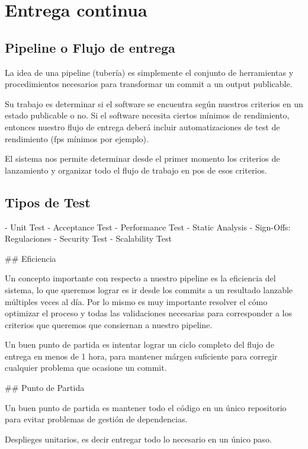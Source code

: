 
\section{Entrega continua}\label{cd:entrega-continua}

\subsection{Pipeline o Flujo de entrega}\label{cd:flujo-de-entrega}

La idea de una pipeline (tubería) es simplemente el conjunto de herramientas y
procedimientos necesarios para transformar un commit a un output publicable.

Su trabajo es determinar si el software se encuentra según nuestros criterios
en un estado publicable o no. Si el software necesita ciertos mínimos de
rendimiento, entonces nuestro flujo de entrega deberá incluir automatizaciones
de test de rendimiento (fps mínimos por ejemplo).

El sistema nos permite determinar desde el primer momento los criterios de
lanzamiento y organizar todo el flujo de trabajo en pos de esos criterios.

\subsection{Tipos de Test}

- Unit Test
- Acceptance Test
- Performance Test
- Static Analysis
- Sign-Offs: Regulaciones
- Security Test
- Scalability Test

## Eficiencia

Un concepto importante con respecto a nuestro pipeline es la eficiencia del
sistema, lo que queremos lograr es ir desde los commits a un resultado lanzable
múltiples veces al día. Por lo mismo es muy importante resolver el cómo
optimizar el proceso y todas las validaciones necesarias para corresponder a
los criterios que queremos que consiernan a nuestro pipeline.

Un buen punto de partida es intentar lograr un ciclo completo del flujo de entrega en menos de 1 hora, para mantener márgen suficiente para corregir cualquier problema que ocasione un commit.

## Punto de Partida

Un buen punto de partida es mantener todo el código en un único repositorio para evitar problemas de gestión de dependencias.

Desplieges unitarios, es decir entregar todo lo necesario en un único paso.




